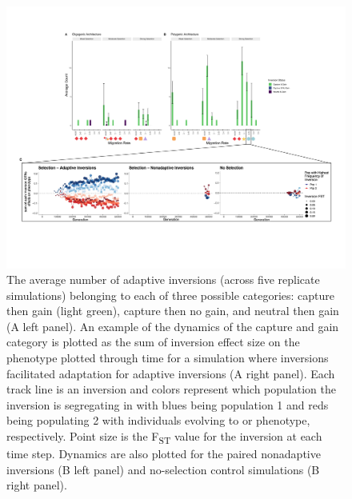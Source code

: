 \documentclass[10pt, scrartlc]{article}
\begin{document}
\begin{figure}[h]
	\begin{center}
		\includegraphics[width = 6.5 in]{Fig4_evoHist.pdf}
	\end{center}
	\caption[Evolutionary History of Adaptive Inversions]{The average number of adaptive inversions (across five replicate simulations) belonging to each of three possible categories: capture then gain (light green), capture then no gain, and neutral then gain (A left panel). An example of the dynamics of the capture and gain category is plotted as the sum of inversion effect size on the phenotype plotted through time for a simulation where inversions facilitated adaptation for adaptive inversions (A right panel). Each track line is an inversion and colors represent which population the inversion is segregating in with blues being population 1 and reds being populating 2 with individuals evolving to  or  phenotype, respectively. Point size is the F\textsubscript{ST} value for the inversion at each time step. Dynamics are also plotted for the paired nonadaptive inversions (B left panel) and no-selection control simulations (B right panel).}
\end{figure}
\end{document}
